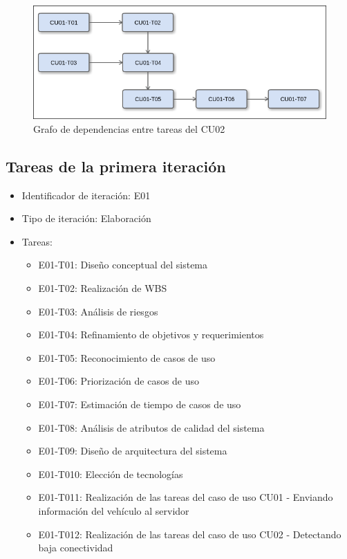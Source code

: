 \begin{figure}	
  \centering
    \includegraphics[width=1\textwidth]{./imagenes/dependenciasCU02.png}
  \caption{Grafo de dependencias entre tareas del CU02}
\end{figure}


\newpage

\subsection{Tareas de la primera iteración}

\begin{itemize}
\item Identificador de iteración: E01
\item Tipo de iteración: Elaboración
\item Tareas:
\begin{itemize}
\item E01-T01: Diseño conceptual del sistema 
\item E01-T02: Realización de WBS 
\item E01-T03: Análisis de riesgos 
\item E01-T04: Refinamiento de objetivos y requerimientos 
\item E01-T05: Reconocimiento de casos de uso
\item E01-T06: Priorización de casos de uso
\item E01-T07: Estimación de tiempo de casos de uso 
\item E01-T08: Análisis de atributos de calidad del sistema 
\item E01-T09: Diseño de arquitectura del sistema 
\item E01-T010: Elección de tecnologías 
\item E01-T011: Realización de las tareas del caso de uso CU01 - Enviando información del vehículo al servidor 
\item E01-T012: Realización de las tareas del caso de uso CU02 - Detectando baja conectividad 
\end{itemize}
\end{itemize}


